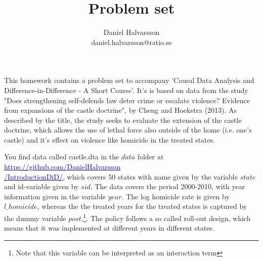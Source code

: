\documentclass[12pt]{article}
\begin{document}
\author{Daniel Halvarsson\\ daniel.halvarsson@ratio.se} %

\title{Problem set}
\maketitle
\date{}
\noindent This homework contains a problem set to accompany 'Causal Data Analysis and Difference-in-Difference - A Short Course'. It's is based on data from the study "Does strengthening self-defends law deter crime or escalate violence? Evidence from expansions of the castle doctrine", by Cheng and Hoekstra (2013). As described by the title, the study seeks to evaluate the extension of the castle doctrine, which allows the use of lethal force also outside of the home (i.e. one's castle) and it's effect on violence like homicide in the treated states.

You find data called castle.dta in the $data$ folder at \href{https://github.com/DanielHalvarsson/IntroductionDiD/}{\textcolor{blue}{https://github.com/DanielHalvarsson\\ /IntroductionDiD/}}, which covers 50 states with name given by the variable $state$ and id-variable given by $sid$. The data covers the period 2000-2010, with year information given in the variable $year$. The log homicide rate is given by $l\_homicide$, whereas the the treated years for the treated states is captured by the dummy variable $post$.\footnote{Note that this variable can be interpreted as an interaction term}. The policy follows a so called roll-out design, which means that it was implemented at different years in different states.
\end{document}
